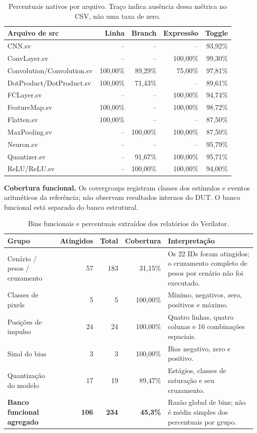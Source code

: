 \documentclass[12pt,a4paper]{article}
\begin{document}
\begin{table}[H]\centering\small
\begin{tabular}{p{8.5cm}rrrr}\toprule
\textbf{Arquivo de src} & \textbf{Linha} & \textbf{Branch} & \textbf{Expressão} & \textbf{Toggle}\\\midrule
CNN.sv & -- & -- & -- & 93,92\%\\
ConvLayer.sv & -- & -- & 100,00\% & 99,30\%\\
Convolution/Convolution.sv & 100,00\% & 89,29\% & 75,00\% & 97,81\%\\
DotProduct/DotProduct.sv & 100,00\% & 71,43\% & -- & 89,61\%\\
FCLayer.sv & -- & -- & 100,00\% & 94,74\%\\
FeatureMap.sv & 100,00\% & -- & 100,00\% & 98,72\%\\
Flatten.sv & 100,00\% & -- & -- & 87,50\%\\
MaxPooling.sv & -- & 100,00\% & 100,00\% & 87,50\%\\
Neuron.sv & -- & -- & -- & 95,79\%\\
Quantizer.sv & -- & 91,67\% & 100,00\% & 95,71\%\\
ReLU/ReLU.sv & -- & 100,00\% & 100,00\% & 94,00\%\\\bottomrule
\end{tabular}
\caption{Percentuais nativos por arquivo. Traço indica ausência dessa métrica no CSV, não uma taxa de zero.}
\end{table}

\textbf{Cobertura funcional.} Os covergroups registram classes dos estímulos e eventos aritméticos da referência; não observam resultados internos do DUT. O banco funcional está separado do banco estrutural.

\begin{table}[H]\centering\small
\begin{tabularx}{\textwidth}{p{6.2cm}rrrX}\toprule
\textbf{Grupo} & \textbf{Atingidos} & \textbf{Total} & \textbf{Cobertura} & \textbf{Interpretação}\\\midrule
Cenário / pesos / cruzamento & 57 & 183 & 31,15\% & Os 22 IDs foram atingidos; o cruzamento completo de pesos por cenário não foi executado.\\
Classes de pixels & 5 & 5 & 100,00\% & Mínimo, negativos, zero, positivos e máximo.\\
Posições de impulso & 24 & 24 & 100,00\% & Quatro linhas, quatro colunas e 16 combinações espaciais.\\
Sinal do bias & 3 & 3 & 100,00\% & Bias negativo, zero e positivo.\\
Quantização do modelo & 17 & 19 & 89,47\% & Estágios, classes de saturação e seu cruzamento.\\\midrule
\textbf{Banco funcional agregado} & \textbf{106} & \textbf{234} & \textbf{45,3\%} & Razão global de bins; não é média simples dos percentuais por grupo.\\\bottomrule
\end{tabularx}
\caption{Bins funcionais e percentuais extraídos dos relatórios do Verilator.}
\end{table}
\end{document}
